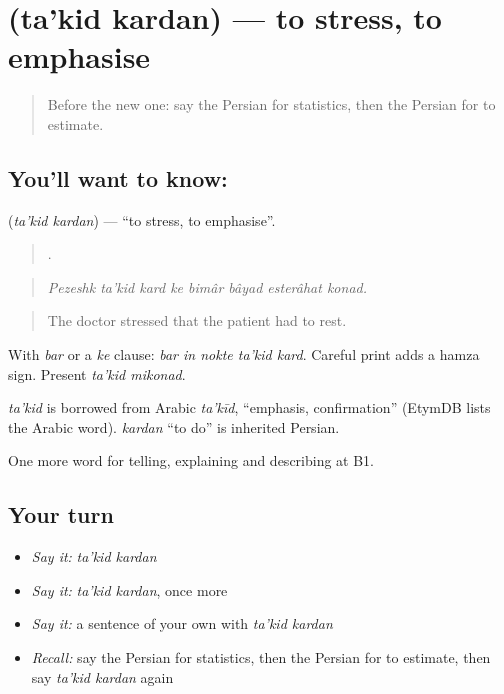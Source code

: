 \section[\texorpdfstring{\fa{تاکید} \fa{کردن} (ta'kid kardan)}{تاکید کردن (ta'kid kardan)}]{  (ta'kid kardan) — to stress, to emphasise}

\label{lesson:FA-C313-takid-kardan}



\begin{quote}
Before the new one: say the Persian for statistics, then the Persian for to estimate.
\end{quote}

\subsection*{You'll want to know:  }
\textbf{ } (\emph{ta'kid kardan}) — \textquotedblleft{}to stress, to emphasise\textquotedblright{}.

\begin{quote}
       .
\end{quote}

\begin{quote}
\emph{Pezeshk ta'kid kard ke bimâr bâyad esterâhat konad.}
\end{quote}

\begin{quote}
The doctor stressed that the patient had to rest.
\end{quote}

With \emph{bar} or a \emph{ke} clause: \emph{bar in nokte ta'kid kard}. Careful print adds a hamza sign. Present \emph{ta'kid mikonad}.

\begin{cousinweb}
\emph{ta'kid} is borrowed from Arabic \emph{ta'kīd}, \textquotedblleft{}emphasis, confirmation\textquotedblright{} (EtymDB lists the Arabic word). \emph{kardan} \textquotedblleft{}to do\textquotedblright{} is inherited Persian.
\end{cousinweb}

\begin{grammarlens}[title={What you've built}]
One more word for telling, explaining and describing at B1.
\end{grammarlens}

\subsection*{Your turn}
\begin{itemize}
\raggedright
  \item \emph{Say it:} \emph{ta'kid kardan}
  \item \emph{Say it:} \emph{ta'kid kardan}, once more
  \item \emph{Say it:} a sentence of your own with \emph{ta'kid kardan}
  \item \emph{Recall:} say the Persian for statistics, then the Persian for to estimate, then say \emph{ta'kid kardan} again
\end{itemize}

